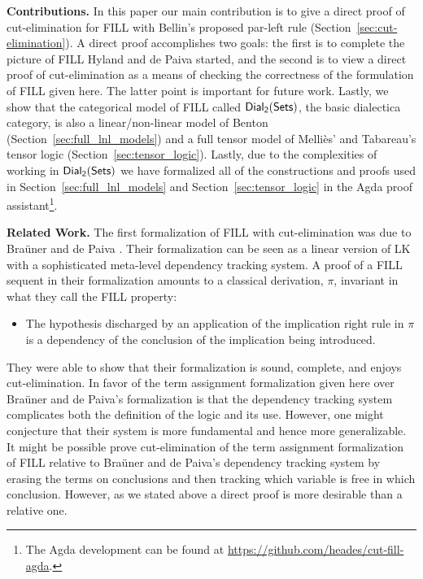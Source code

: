 \textbf{Contributions.} In this paper our main contribution is to give
a direct proof of cut-elimination for FILL with Bellin's proposed
par-left rule (Section~\ref{sec:cut-elimination}).  A direct proof
accomplishes two goals: the first is to complete the picture of FILL
Hyland and de Paiva started, and the second is to view a direct proof
of cut-elimination as a means of checking the correctness of the
formulation of FILL given here.  The latter point is important for
future work.  Lastly, we show that the categorical model of FILL
called $\mathsf{Dial_2}(\mathsf{Sets})$, the basic dialectica category, is also a
linear/non-linear model of Benton (Section~\ref{sec:full_lnl_models})
and a full tensor model of Melli\`es' and Tabareau's tensor logic
(Section~\ref{sec:tensor_logic}). Lastly, due to the complexities
of working in $\mathsf{Dial_2}(\mathsf{Sets})$ we have formalized all of the constructions and
proofs used in Section~\ref{sec:full_lnl_models} and
Section~\ref{sec:tensor_logic} in the Agda proof
assistant\footnote{The Agda development can be found at
  \url{https://github.com/heades/cut-fill-agda}.}.

\textbf{Related Work.} The first formalization of FILL with
cut-elimination was due to Bra\"uner and de Paiva \cite{Brauner:1998}.
Their formalization can be seen as a linear version of LK with a
sophisticated meta-level dependency tracking system.  A proof of a
FILL sequent in their formalization amounts to a classical derivation,
$\pi$, invariant in what they call the FILL property:
\begin{center}
  \begin{itemize}
  \item The hypothesis discharged by an application of the implication
    right rule in $\pi$ is a dependency of the conclusion of the
    implication being introduced.
  \end{itemize}
\end{center}
They were able to show that their formalization is sound, complete,
and enjoys cut-elimination.  In favor of the term assignment
formalization given here over Bra\"uner and de Paiva's formalization
is that the dependency tracking system complicates both the definition
of the logic and its use.  However, one might conjecture that their
system is more fundamental and hence more generalizable.  It might be
possible prove cut-elimination of the term assignment formalization of
FILL relative to Bra\"uner and de Paiva's dependency tracking system
by erasing the terms on conclusions and then tracking which variable
is free in which conclusion.  However, as we stated above a direct
proof is more desirable than a relative one.

